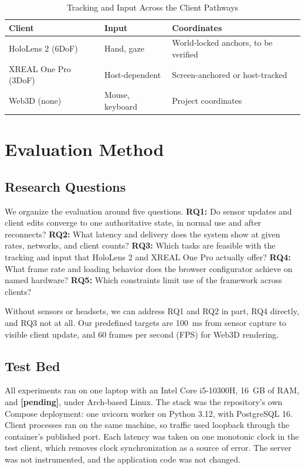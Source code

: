 \documentclass[conference]{IEEEtran}
\newcommand{\gpuName}{\textbf{[pending]}}
\begin{document}
\begin{table}[t]
\caption{Tracking and Input Across the Client Pathways}
\label{tab:tracking}
\centering
\footnotesize
\begin{tabularx}{\columnwidth}{@{}p{}p{}Y@{}}
\toprule
\textbf{Client} & \textbf{Input} & \textbf{Coordinates}\\
\midrule
HoloLens 2 (6DoF) & Hand, gaze & World-locked anchors, to be verified\\
XREAL One Pro (3DoF) & Host-dependent & Screen-anchored or host-tracked\\
Web3D (none) & Mouse, keyboard & Project coordinates\\
\bottomrule
\end{tabularx}
\end{table}

\section{Evaluation Method}
\label{sec:method}
\subsection{Research Questions}
We organize the evaluation around five questions. \textbf{RQ1:} Do sensor updates and client edits converge to one authoritative state, in normal use and after reconnects? \textbf{RQ2:} What latency and delivery does the system show at given rates, networks, and client counts? \textbf{RQ3:} Which tasks are feasible with the tracking and input that HoloLens 2 and XREAL One Pro actually offer? \textbf{RQ4:} What frame rate and loading behavior does the browser configurator achieve on named hardware? \textbf{RQ5:} Which constraints limit use of the framework across clients?

Without sensors or headsets, we can address RQ1 and RQ2 in part, RQ4 directly, and RQ3 not at all. Our predefined targets are 100~ms from sensor capture to visible client update, and 60 frames per second (FPS) for Web3D rendering.

\subsection{Test Bed}
All experiments ran on one laptop with an Intel Core i5-10300H, 16~GB of RAM, and \gpuName{}, under Arch-based Linux. The stack was the repository's own Compose deployment: one uvicorn worker on Python 3.12, with PostgreSQL 16. Client processes ran on the same machine, so traffic used loopback through the container's published port. Each latency was taken on one monotonic clock in the test client, which removes clock synchronization as a source of error. The server was not instrumented, and the application code was not changed.
\end{document}
